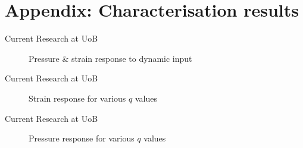 \documentclass[aspectratio=169]{beamer}            %
\begin{document}
\section[Characterisation results]{Appendix: Characterisation results}
%
%

\begin{frame}{Current Research at UoB}

  \begin{figure}[!htb]
    \centering
		
		\caption{Pressure \& strain response to dynamic input}
		\label{fig:DistSens_DynResponse}
  \end{figure}

\end{frame}
\begin{frame}{Current Research at UoB}

  \begin{figure}[!htb]
    \centering
		
		\caption{Strain response for various ${q}$ values}
		\label{fig:PressureResponse2q}
  \end{figure}

\end{frame}

\begin{frame}{Current Research at UoB}

  \begin{figure}[!htb]
    \centering
		
		\caption{Pressure response for various ${q}$ values}
		\label{fig:Pressure
		Response2q}
  \end{figure}

\end{frame}

\end{document}
